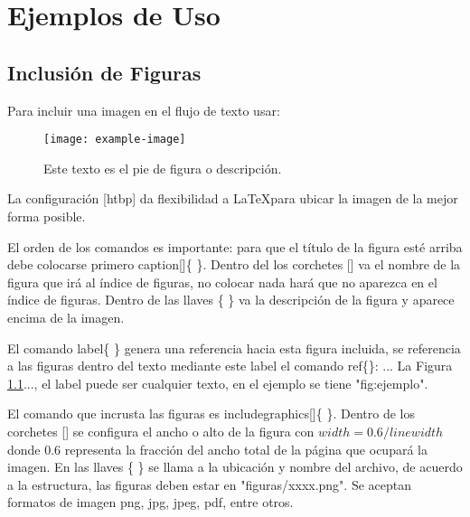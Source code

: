 \chapter{Ejemplos de Uso}
\doublespacing %
\raggedbottom %

\section{Inclusión de Figuras}

Para incluir una imagen en el flujo de texto usar:

\begin{figure}[htbp]
	\centering
        \caption[Este texto va al índice de figuras, no debe  omitirse y normalmente es el mismo que la descripción.]{Este texto es el pie de figura o descripción.}
        \label{fig:ejemplo}
	\texttt{[image: example-image]}
\end{figure}

La configuración [htbp] da flexibilidad a \LaTeX para ubicar la imagen de la mejor forma posible.

El orden de los comandos es importante: para que el título de la figura esté arriba debe colocarse primero caption[]\{ \}. Dentro del los corchetes [] va el nombre de la figura que irá al índice de figuras, no colocar nada hará que no aparezca en el índice de figuras. Dentro de las llaves \{ \} va la descripción de la figura y aparece encima de la imagen.

El comando label\{ \} genera una referencia hacia esta figura incluida, se referencia a las figuras dentro del texto mediante este label el comando ref\{\}: ... La Figura \ref{fig:ejemplo}..., el label puede ser cualquier texto, en el ejemplo se tiene "fig:ejemplo".

El comando que incrusta las figuras es includegraphics[]\{ \}. Dentro de los corchetes [] se configura el ancho o alto de la figura con $width=0.6 /linewidth$ donde 0.6 representa la fracción del ancho total de la página que ocupará la imagen. En las llaves \{ \} se llama a la ubicación y nombre del archivo, de acuerdo a la estructura, las figuras deben estar en "figuras/xxxx.png". Se aceptan formatos de imagen png, jpg, jpeg, pdf, entre otros.



